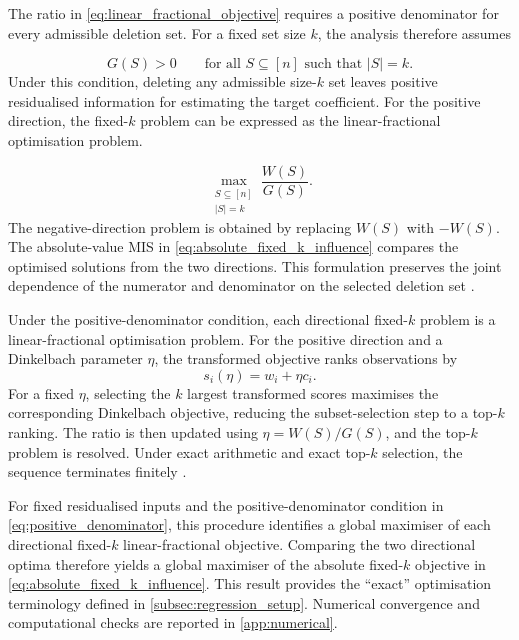 \documentclass[../main.tex]{subfiles}
\begin{document}
The ratio in \autoref{eq:linear_fractional_objective} requires a positive denominator for every admissible deletion set. For a fixed set size $k$, the analysis therefore assumes

\begin{equation}
G(S)>0
\qquad
\text{for all } S\subseteq[n] \text{ such that } |S|=k.
\label{eq:positive_denominator}
\end{equation}
Under this condition, deleting any admissible size-\(k\) set leaves positive residualised information for estimating the target coefficient. For the positive direction, the fixed-\(k\) problem can be expressed as the linear-fractional optimisation problem.

\begin{equation}
\max_{\substack{S\subseteq[n]\\|S|=k}}
\frac{W(S)}{G(S)}.
\label{eq:fixed_k_fractional_problem}
\end{equation}
The negative-direction problem is obtained by replacing \(W(S)\) with \(-W(S)\). The absolute-value MIS in \autoref{eq:absolute_fixed_k_influence} compares the optimised solutions from the two directions. This formulation preserves the joint dependence of the numerator and denominator on the selected deletion set \parencite{konrad2026finding}.

Under the positive-denominator condition, each directional fixed-\(k\) problem is a linear-fractional optimisation problem. For the positive direction and a Dinkelbach parameter \(\eta\), the transformed objective ranks observations by
\[
s_i(\eta)=w_i+\eta c_i.
\]
For a fixed \(\eta\), selecting the \(k\) largest transformed scores maximises the corresponding Dinkelbach objective, reducing the subset-selection step to a top-\(k\) ranking. The ratio is then updated using \(\eta=W(S)/G(S)\), and the top-\(k\) problem is resolved. Under exact arithmetic and exact top-\(k\) selection, the sequence terminates finitely \parencite{dinkelbach1967nonlinear,konrad2026finding}.

For fixed residualised inputs and the positive-denominator condition in \autoref{eq:positive_denominator}, this procedure identifies a global maximiser of each directional fixed-\(k\) linear-fractional objective. Comparing the two directional optima therefore yields a global maximiser of the absolute fixed-\(k\) objective in \autoref{eq:absolute_fixed_k_influence}. This result provides the ``exact'' optimisation terminology defined in \autoref{subsec:regression_setup}. Numerical convergence and computational checks are reported in \autoref{app:numerical}.
\end{document}
